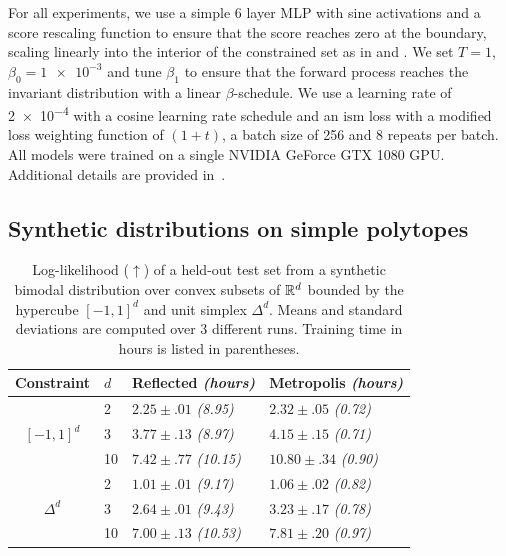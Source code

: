For all experiments, we use a simple 6 layer MLP with sine activations and a score rescaling function to ensure that the score reaches zero at the boundary, scaling linearly into the interior of the constrained set as in \cite{liu2022estimating} and \cite{fishman2023diffusion}.
We set $T=1$, $\beta_0=\num{1e-3}$ and tune $\beta_1$ to ensure that the forward process reaches the invariant distribution with a linear $\beta$-schedule.
We use a learning rate of \num{2e-4} with a cosine learning rate schedule and an $\mathrm{ism}$ loss with a modified loss weighting function of $(1 + t)$, a batch size of 256 and 8 repeats per batch.
All models were trained on a single NVIDIA GeForce GTX 1080 GPU.
Additional details are provided in~.

\subsection{Synthetic distributions on simple polytopes}
\label{sec:exp_synthetic_tasks}

\begin{table}
	\caption{
		Log-likelihood ($\uparrow$) of a held-out test set from a synthetic bimodal distribution over convex subsets of $\mathbb{R}^d$ bounded by the hypercube \([-1,1]^d\) and unit simplex \(\Delta^d\).
		Means and standard deviations are computed over 3 different runs.
		Training time in hours is listed in parentheses.
	}
	\label{tab:synthetic_polytope_dupref}
	\centering

	\begin{tabular}{clll}
		\toprule
		Constraint & \(d\) & {Reflected \emph{(hours)}}    & {Metropolis \emph{(hours)}}              \\
		\midrule
		\multirow{3}{*}{$[-1,1]^d$}
		           & 2     & $2.25\pm{.01}$ \emph{(8.95)}  & $\mathbf{2.32\pm{.05}}$ \emph{(0.72)}    \\
		           & 3     & $3.77\pm{.13}$ \emph{(8.97)}  & $\mathbf{4.15\pm{.15}}$ \emph{(0.71)}    \\
		           & 10    & $7.42\pm{.77}$ \emph{(10.15)} & $\mathbf{10.80 \pm{.34 }}$ \emph{(0.90)} \\
		\midrule
		\multirow{3}{*}{$\Delta^d$}
		           & 2     & $1.01 \pm{.01}$ \emph{(9.17)} & $\mathbf{1.06\pm{.02}}$ \emph{(0.82)}    \\
		           & 3     & $2.64\pm{.01}$ \emph{(9.43)}  & $\mathbf{3.23\pm{.17}}$  \emph{(0.78)}   \\
		           & 10    & $7.00\pm{.13}$ \emph{(10.53)} & $\mathbf{7.81\pm{.20}}$ \emph{(0.97)}    \\
		\bottomrule
	\end{tabular}
\end{table}

